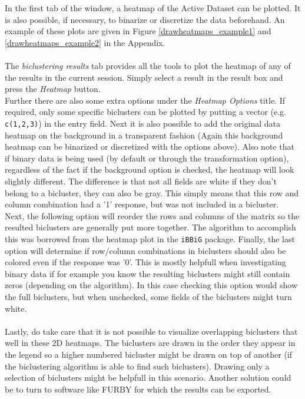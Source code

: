 \documentclass[a4paper]{article}\usepackage[]{graphicx}\usepackage[]{color}
\begin{document}
\noindent In the first tab of the window, a heatmap of the Active Dataset can be
plotted. It is also possible, if necessary, to binarize or discretize the data
beforehand. An example of these plots are given in Figure
\ref{drawheatmaps_example1} and \ref{drawheatmaps_example2} in the Appendix.
\\ \\
\noindent The {\it biclustering results} tab provides all the tools to plot the
heatmap of any of the results in the current session. Simply select a result in
the result box and press the {\it Heatmap} button. \\
Further there are also some extra options under the {\it Heatmap Options} title.
If required, only some specific biclusters can be plotted by putting a vector
(e.g. \verb|c(1,2,3)|) in the entry field. Next it is also possible to add the
original data heatmap on the background in a transparent fashion (Again this
background heatmap can be binarized or discretized with the options above).
Also note that if binary data is being used (by default or through the
transformation option), regardless of the fact if the background option is
checked, the heatmap will look slightly different. The difference is that not
all fields are white if they don't belong to a bicluster, they can also be gray.
This simply means that this row and column combination had a '1' response, but
was not included in a bicluster.\\
Next, the following option will reorder the rows and columns of the matrix so
the resulted biclusters are generally put more together. The algorithm to
accomplish this was borrowed from the heatmap plot in the \verb|iBBiG| package.
Finally, the last option will determine if row/column combinations in biclusters should also be colored even if the response was '0'. This is mostly helpfull when investigating
binary data if for example you know the resulting biclusters might still
contain zeros (depending on the algorithm). In this case checking this option would show
the full biclusters, but when unchecked, some fields of the biclusters might
turn white.
\\ \\
Lastly, do take care that it is not possible to visualize overlapping biclusters
that well in these 2D heatmaps. The biclusters are drawn in the order they
appear in the legend so a higher numbered bicluster might be drawn on top of
another (if the biclustering algorithm is able to find such biclusters). Drawing only a
selection of biclusters might be helpfull in this
scenario. Another solution could be to turn to software like FURBY
for which the results can be exported.
\end{document}
